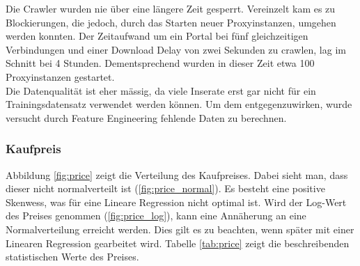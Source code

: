\newline
%
Die Crawler wurden nie über eine längere Zeit gesperrt. Vereinzelt kam es zu Blockierungen, die jedoch, durch das Starten neuer Proxyinstanzen, umgehen werden konnten. Der Zeitaufwand um ein Portal bei fünf gleichzeitigen Verbindungen und einer Download Delay von zwei Sekunden zu crawlen, lag im Schnitt bei 4 Stunden. Dementsprechend wurden in dieser Zeit etwa 100 Proxyinstanzen gestartet.\\[2ex]
%
Die Datenqualität ist eher mässig, da viele Inserate erst gar nicht für ein Trainingsdatensatz verwendet werden können. Um dem entgegenzuwirken, wurde versucht durch Feature Engineering fehlende Daten zu berechnen.
%
\subsubsection{Kaufpreis}
Abbildung \ref{fig:price} zeigt die Verteilung des Kaufpreises. Dabei sieht man, dass dieser nicht normalverteilt ist (\ref{fig:price_normal}). Es besteht eine positive Skenwess, was für eine Lineare Regression nicht optimal ist. Wird der Log-Wert des Preises genommen (\ref{fig:price_log}), kann eine Annäherung an eine Normalverteilung erreicht werden. Dies gilt es zu beachten, wenn später mit einer Linearen Regression gearbeitet wird.
Tabelle \ref{tab:price} zeigt die beschreibenden statistischen Werte des Preises.
%
